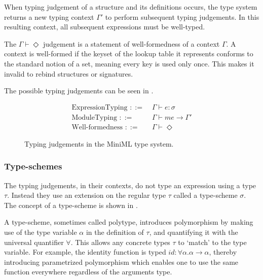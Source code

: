When typing judgement of a structure and its definitions occurs, the type system returns a new typing context $\Gamma'$ to perform subsequent typing judgements.
In this resulting context, all subsequent expressions must be well-typed.

The $\Gamma \vdash \Diamond$ judgement is a statement of well-formedness of a context $\Gamma$. 
A context is well-formed if the keyset of the lookup table it represents conforms to the standard notion of a set, meaning every key is used only once.
This makes it invalid to rebind structures or signatures.

The possible typing judgements can be seen in .

\begin{figure}[!htb]
\begin{align*}
\text{ExpressionTyping } ::=\;&\Gamma \vdash e: \sigma \\
\text{ModuleTyping } ::= \; &\Gamma \vdash \mathit{me} \rightarrow \Gamma' \\
\text{Well-formedness } ::=\;&\Gamma \vdash \Diamond
\end{align*}
\caption{Typing judgements in the MiniML type system.}
\label{fig:TypingJudgements}
\end{figure}

\subsubsection{Type-schemes}
The typing judgements, in their contexts, do not type an expression using a type $\tau$. Instead they use an extension on the regular type $\tau$ called a type-scheme $\sigma$.
The concept of a type-scheme is shown in .

A type-scheme, sometimes called polytype, introduces polymorphism by making use of the type variable $\alpha$ in the definition of $\tau$, and quantifying it with the universal quantifier $\forall$.
This allows any concrete types $\tau$ to `match' to the type variable.
For example, the identity function  is typed $id:\forall \alpha. \alpha \rightarrow \alpha$, thereby introducing parametrized polymorphism which enables one to use the same  function everywhere regardless of the arguments type.

